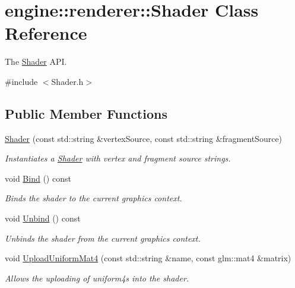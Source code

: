 \hypertarget{classengine_1_1renderer_1_1Shader}{}\section{engine\+:\+:renderer\+:\+:Shader Class Reference}
\label{classengine_1_1renderer_1_1Shader}


The \hyperlink{classengine_1_1renderer_1_1Shader}{Shader} A\+PI.  




{\ttfamily \#include $<$Shader.\+h$>$}

\subsection*{Public Member Functions}
\begin{DoxyCompactItemize}
\item 
\hyperlink{classengine_1_1renderer_1_1Shader_a48fb2f9ae7b37051093275c2ecbbae9e}{Shader} (const std\+::string \&vertex\+Source, const std\+::string \&fragment\+Source)
\begin{DoxyCompactList}\small\item\em Instantiates a \hyperlink{classengine_1_1renderer_1_1Shader}{Shader} with vertex and fragment source strings. \end{DoxyCompactList}\item 
\mbox{\label{classengine_1_1renderer_1_1Shader_a44e090922cee0b54525dee744a4896ba}} 
void \hyperlink{classengine_1_1renderer_1_1Shader_a44e090922cee0b54525dee744a4896ba}{Bind} () const
\begin{DoxyCompactList}\small\item\em Binds the shader to the current graphics context. \end{DoxyCompactList}\item 
\mbox{\label{classengine_1_1renderer_1_1Shader_a9dad03ff8a12cebea905b507e4e58833}} 
void \hyperlink{classengine_1_1renderer_1_1Shader_a9dad03ff8a12cebea905b507e4e58833}{Unbind} () const
\begin{DoxyCompactList}\small\item\em Unbinds the shader from the current graphics context. \end{DoxyCompactList}\item 
\mbox{\label{classengine_1_1renderer_1_1Shader_a4d743a0c11b6978ef625c51489e63906}} 
void \hyperlink{classengine_1_1renderer_1_1Shader_a4d743a0c11b6978ef625c51489e63906}{Upload\+Uniform\+Mat4} (const std\+::string \&name, const glm\+::mat4 \&matrix)
\begin{DoxyCompactList}\small\item\em Allows the uploading of uniform4s into the shader. \end{DoxyCompactList}\end{DoxyCompactItemize}


